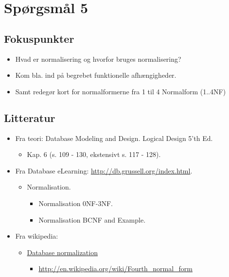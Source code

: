 \section{Spørgsmål 5}

\subsection{Fokuspunkter}
\begin{itemize}
	\item Hvad er normalisering og hvorfor bruges normalisering?
	\item Kom bla. ind på begrebet funktionelle afhængigheder.
	\item Samt redegør kort for normalformerne fra 1 til 4 Normalform (1..4NF)
\end{itemize}

\subsection{Litteratur}
\begin{itemize}
	
	\item Fra teori: Database Modeling and Design. Logical Design 5'th Ed.
	\begin{itemize}
		\item Kap. 6 (s. 109 - 130, ekstensivt s. 117 - 128).
	\end{itemize}
	
	\item Fra Database eLearning: \url{http://db.grussell.org/index.html}.
	\begin{itemize}
		\item Normalisation.
		\begin{itemize}
			\item Normalisation 0NF-3NF.
			\item Normalisation BCNF and Example.
		\end{itemize}
	\end{itemize}
	
	\item Fra wikipedia:
	\begin{itemize}
		\item \href{https://en.wikipedia.org/wiki/Database_normalization}{Database normalization}
		\begin{itemize}
			\item \url{http://en.wikipedia.org/wiki/Fourth_normal_form}
		\end{itemize}
	\end{itemize}
%	
\end{itemize}

